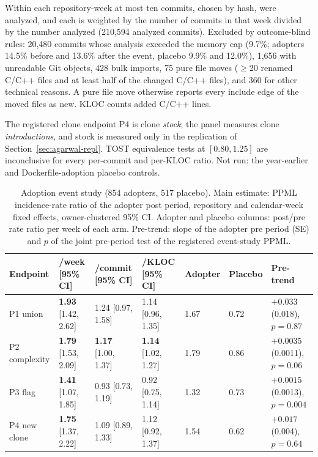 \documentclass[sigplan,11pt,nonacm=true]{acmart}
\begin{document}
Within each repository-week at most ten commits, chosen by hash, were
analyzed, and each is weighted by the number of commits in that week divided
by the number analyzed (210{,}594 analyzed commits). Excluded by outcome-blind
rules: 20{,}480 commits whose analysis exceeded the memory cap (9.7\%;
adopters 14.5\% before and 13.6\% after the event, placebo 9.9\% and 12.0\%),
1{,}656 with unreadable Git objects, 428 bulk imports, 75 pure file moves
($\ge$20 renamed C/C++ files and at least half of the changed C/C++ files),
and 360 for other technical reasons. A pure file move otherwise reports every
include edge of the moved files as new. KLOC counts added C/C++ lines.

The registered clone endpoint P4 is clone \emph{stock}; the panel measures
clone \emph{introductions}, and stock is measured only in the replication of
Section~\ref{sec:agarwal-repl}. TOST equivalence tests at $[0.80, 1.25]$ are
inconclusive for every per-commit and per-KLOC ratio. Not run: the
year-earlier and Dockerfile-adoption placebo controls.

\begin{table}[t]
\caption{Adoption event study (854 adopters, 517 placebo). Main estimate:
PPML incidence-rate ratio of the adopter post period, repository and
calendar-week fixed effects, owner-clustered 95\% CI. Adopter and placebo
columns: post/pre rate ratio per week of each arm. Pre-trend: slope of the
adopter pre period (SE) and $p$ of the joint pre-period test of the
registered event-study PPML.}
\label{tab:event}
\small
\begin{tabular}{@{}lllllll@{}}
\toprule
Endpoint & /week [95\% CI] & /commit [95\% CI] & /KLOC [95\% CI] & Adopter & Placebo & Pre-trend \\
\midrule
P1 union      & \textbf{1.93} [1.42, 2.62] & 1.24 [0.97, 1.58] & 1.14 [0.96, 1.35] & 1.67 & 0.72 & $+0.033$ (0.018), $p=0.87$ \\
P2 complexity & \textbf{1.79} [1.53, 2.09] & \textbf{1.17} [1.00, 1.37] & \textbf{1.14} [1.02, 1.27] & 1.79 & 0.86 & $+0.0035$ (0.0011), $p=0.06$ \\
P3 flag       & \textbf{1.41} [1.07, 1.85] & 0.93 [0.73, 1.19] & 0.92 [0.75, 1.14] & 1.32 & 0.73 & $+0.0015$ (0.0013), $p=0.004$ \\
P4 new clone  & \textbf{1.75} [1.37, 2.22] & 1.09 [0.89, 1.33] & 1.12 [0.92, 1.37] & 1.54 & 0.62 & $+0.017$ (0.004), $p=0.64$ \\
\bottomrule
\end{tabular}
\end{table}
\end{document}
